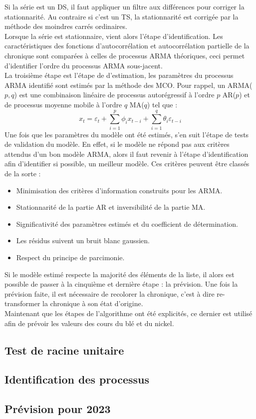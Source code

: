 Si la série est un DS, il faut appliquer un filtre aux différences pour corriger la stationnarité. Au contraire si c'est un TS, la stationnarité est corrigée par la 
méthode des moindres carrés ordinaires.\\[11pt]
Lorsque la série est stationnaire, vient alors l'étape d'identification. Les caractéristiques des fonctions d'autocorrélation et autocorrélation partielle de la chronique
sont comparées à celles de processus ARMA théoriques, ceci permet d'identifier l'ordre du processus ARMA sous-jacent.\\[11pt]
La troisième étape est l'étape de d'estimation, les paramètres du processus ARMA identifié sont estimés par la méthode des MCO. Pour rappel, un ARMA($p,q$) est une 
combinaison linéaire de processus autorégressif à l'ordre $p$ AR($p$) et de processus moyenne mobile à l'ordre $q$ MA($q$) tel que :
\begin{equation*}
    x_t = \varepsilon_t +  \sum_{i=1}^p \phi_i x_{t-i} + \sum_{i=1}^q \theta_i \varepsilon_{t-i}
\end{equation*}
Une fois que les paramètres du modèle ont été estimés, s'en suit l'étape de tests de validation du modèle. En effet, si le modèle ne répond pas aux critères attendus 
d'un bon modèle ARMA, alors il faut revenir à l'étape d'identification afin d'identifier si possible, un meilleur modèle. Ces critères peuvent être classés de la sorte :
\begin{itemize}
    \item Minimisation des critères d'information construits pour les ARMA.
    \item Stationnarité de la partie AR et inversibilité de la partie MA.
    \item Significativité des paramètres estimés et du coefficient de détermination.
    \item Les résidus suivent un bruit blanc gaussien.
    \item Respect du principe de parcimonie.
\end{itemize}
Si le modèle estimé respecte la majorité des éléments de la liste, il alors est possible de passer à la cinquième et dernière étape : la prévision. Une fois la prévision
faite, il est nécessaire de recolorer la chronique, c'est à dire re-transformer la chronique à son état d'origine.\\[11pt]
Maintenant que les étapes de l'algorithme ont été explicités, ce dernier est utilisé afin de prévoir les valeurs des cours du blé et du nickel.
\subsection{Test de racine unitaire}
\subsection{Identification des processus}
\subsection{Prévision pour 2023}
